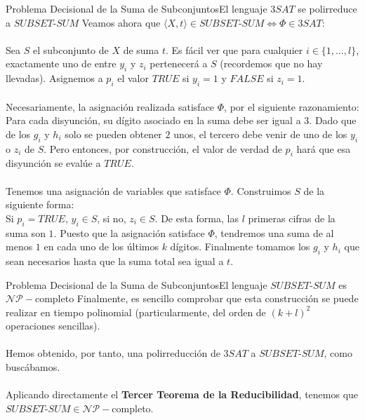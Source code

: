 \documentclass[10pt, envcountsect, presentation, aspectratio=169]{beamer}
\newcommand{\ssum}{\ensuremath{SUBSET\text{-}SUM}}
\begin{document}
\begin{frame}{Problema Decisional de la Suma de Subconjuntos}{El lenguaje $3SAT$ se polirreduce a $\ssum$}
    Veamos ahora que $\langle X, t\rangle \in \ssum \iff  \Phi \in 3SAT$:\\~\\
    \boxed{\Rightarrow} Sea $S$ el subconjunto de $X$ de suma $t$. Es fácil ver que para cualquier $i\in\{1,\dots,l\}$, exactamente uno de entre $y_i$ y $z_i$ pertenecerá a $S$ (recordemos que no hay llevadas). Asignemos a $p_i$ el valor $TRUE$ si $y_i=1$ y $FALSE$ si $z_i=1$. \\~\\
    Necesariamente, la asignación realizada satisface $\Phi$, por el siguiente razonamiento:\\
    Para cada disyunción, su dígito asociado en la suma debe ser igual a $3$. Dado que de los $g_i$ y $h_i$ solo se pueden obtener $2$ unos, el tercero debe venir de uno de los $y_i$ o $z_i$ de $S$. Pero entonces, por construcción, el valor de verdad de $p_i$ hará que esa disyunción se evalúe a $TRUE$.\\~\\
    \boxed{\Leftarrow} Tenemos una asignación de variables que satisface $\Phi$. Construimos $S$ de la siguiente forma:\\
    Si $p_i = TRUE$, $y_i\in S$, si no, $z_i\in S$. De esta forma, las $l$ primeras cifras de la suma son $1$. Puesto que la asignación satisface $\Phi$, tendremos una suma de al menos $1$ en cada uno de los últimos $k$ dígitos. Finalmente tomamos los $g_i$ y $h_i$ que sean necesarios hasta que la suma total sea igual a $t$.
    
\end{frame}

\begin{frame}{Problema Decisional de la Suma de Subconjuntos}{El lenguaje $\ssum$ es $\mathcal{NP}-$completo}
    Finalmente, es sencillo comprobar que esta construcción se puede realizar en tiempo polinomial (particularmente, del orden de $(k+l)^2$ operaciones sencillas).\\~\\
    Hemos obtenido, por tanto, una polirreducción de $3SAT$ a $\ssum$, como buscábamos. \\~\\ 

    Aplicando directamente el \textbf{Tercer Teorema de la Reducibilidad}, tenemos que $\ssum \in \mathcal{NP}-$completo. $\boxed{ }$
\end{frame}
\end{document}
